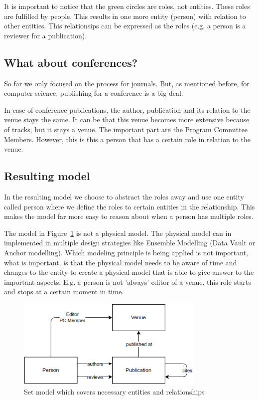 \documentclass{ou-report}
\begin{document}
It is important to notice that the green circles are roles, not entities. These 
roles are fulfilled by people. This results in one more entity (person) with 
relation to other entities. This relationsips can be expressed as the roles 
(e.g. a person is a reviewer for a publication).

\subsection{What about conferences?}
So far we only focused on the process for journals. But, as mentioned before, 
for computer science, publishing for a conference is a big deal.

In case of conference publications, the author, publication and its relation to 
the venue stays the same. It can be that this venue becomes more extensive 
because of tracks, but it stays a venue.
The important part are the Program Committee Members. However, this is this a 
person that has a certain role in relation to the venue.

\subsection{Resulting model}
\label{sec:resulting_model}
In the resulting model we choose to abstract the roles away and use one entity 
called person where we define the roles to certain entities in the relationship. 
This makes the model far more easy to reason about when a person has multiple 
roles.

The model in Figure~\ref{fig:resulting_model} is not a physical model. The 
physical model can in implemented in multiple design strategies like Ensemble 
Modelling (Data Vault or Anchor modelling). Which modeling principle is being 
applied is not important, what is important, is that the physical model needs to 
be aware of time and changes to the entity to create a physical model that is 
able to give answer to the important aspects. E.g. a person is not 'always' 
editor of a venue, this role starts and stops at a certain moment in time.
\begin{figure}[H]
\centering
\includegraphics[width=9cm]{images/set_model.png}
\caption{Set model which covers necessary entities and relationships}
\label{fig:resulting_model}
\end{figure}
\end{document}
